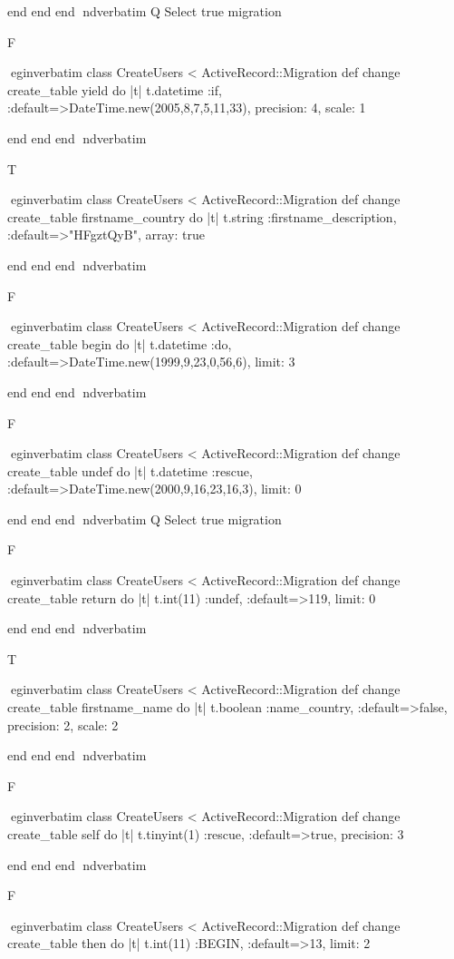     end 
  end 
end
nd{verbatim}
Q
 Select true migration

F

egin{verbatim}
 class CreateUsers < ActiveRecord::Migration 
  def change 
    create_table yield do |t| 
      t.datetime :if, :default=>DateTime.new(2005,8,7,5,11,33), precision: 4, scale: 1
    
    end 
  end 
end
nd{verbatim}

T

egin{verbatim}
 class CreateUsers < ActiveRecord::Migration 
  def change 
    create_table firstname_country do |t| 
      t.string :firstname_description, :default=>"HFgztQyB", array: true
    
    end 
  end 
end
nd{verbatim}

F

egin{verbatim}
 class CreateUsers < ActiveRecord::Migration 
  def change 
    create_table begin do |t| 
      t.datetime :do, :default=>DateTime.new(1999,9,23,0,56,6), limit: 3
    
    end 
  end 
end
nd{verbatim}

F

egin{verbatim}
 class CreateUsers < ActiveRecord::Migration 
  def change 
    create_table undef do |t| 
      t.datetime :rescue, :default=>DateTime.new(2000,9,16,23,16,3), limit: 0
    
    end 
  end 
end
nd{verbatim}
Q
 Select true migration

F

egin{verbatim}
 class CreateUsers < ActiveRecord::Migration 
  def change 
    create_table return do |t| 
      t.int(11) :undef, :default=>119, limit: 0
    
    end 
  end 
end
nd{verbatim}

T

egin{verbatim}
 class CreateUsers < ActiveRecord::Migration 
  def change 
    create_table firstname_name do |t| 
      t.boolean :name_country, :default=>false, precision: 2, scale: 2
    
    end 
  end 
end
nd{verbatim}

F

egin{verbatim}
 class CreateUsers < ActiveRecord::Migration 
  def change 
    create_table self do |t| 
      t.tinyint(1) :rescue, :default=>true, precision: 3
    
    end 
  end 
end
nd{verbatim}

F

egin{verbatim}
 class CreateUsers < ActiveRecord::Migration 
  def change 
    create_table then do |t| 
      t.int(11) :BEGIN, :default=>13, limit: 2
    
